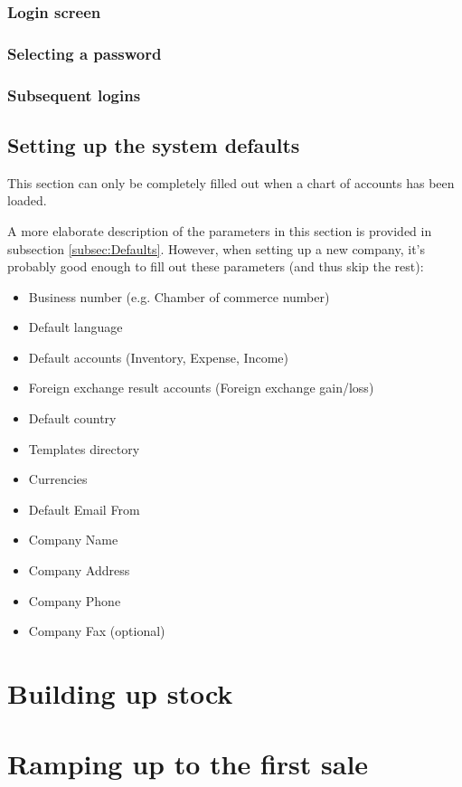 \subsection{Login screen}

\subsection{Selecting a password}

\subsection{Subsequent logins}


\section{Setting up the system defaults}

This section can only be completely filled out when a chart of accounts has been loaded.

A more elaborate description of the parameters in this section is provided in subsection
\ref{subsec:Defaults}. However, when setting up a new company, it's probably good enough
to fill out these parameters (and thus skip the rest):

\begin{itemize}
\item Business number (e.g. Chamber of commerce number)
\item Default language
\item Default accounts (Inventory, Expense, Income)
\item Foreign exchange result accounts (Foreign exchange gain/loss)
\item Default country
\item Templates directory
\item Currencies
\item Default Email From
\item Company Name
\item Company Address
\item Company Phone
\item Company Fax (optional)
\end{itemize}

\chapter{Building up stock}

\chapter{Ramping up to the first sale}

